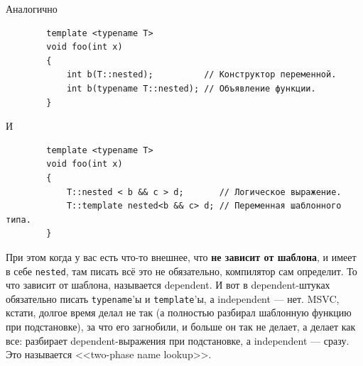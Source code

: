 \documentclass{article}
\begin{document}
    Аналогично
    \begin{verbatim}
        template <typename T>
        void foo(int x)
        {
            int b(T::nested);          // Конструктор переменной.
            int b(typename T::nested); // Объявление функции.
        }
    \end{verbatim}
    И
    \begin{verbatim}
        template <typename T>
        void foo(int x)
        {
            T::nested < b && c > d;       // Логическое выражение.
            T::template nested<b && c> d; // Переменная шаблонного типа.
        }
    \end{verbatim}
    При этом когда у вас есть что-то внешнее, что \textbf{не зависит от шаблона}, и имеет в себе \texttt{nested}, там писать всё это не обязательно, компилятор сам определит. То что зависит от шаблона, называется dependent. И вот в dependent-штуках обязательно писать \texttt{typename}'ы и \texttt{template}'ы, а independent --- нет. MSVC, кстати, долгое время делал не так (а полностью разбирал шаблонную функцию при подстановке), за что его загнобили, и больше он так не делает, а делает как все: разбирает dependent-выражения при подстановке, а independent --- сразу. Это называется <<two-phase name lookup>>.
\end{document}
